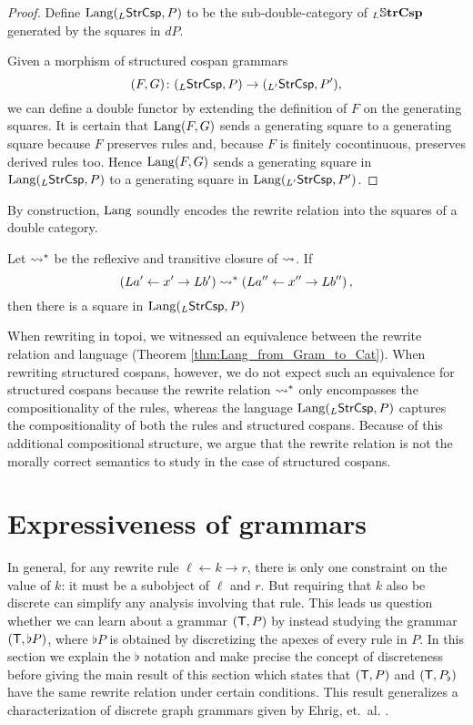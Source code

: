 \documentclass[oneside]{amsart}
\begin{document}
\begin{proof}
  Define $\mathrm{Lang} (_L\mathsf{StrCsp},P)$ to be the
  sub-double-category of $_L\mathbb{S} \mathbf{trCsp}$ generated
  by the squares in $dP$.
  
  Given a morphism of structured cospan grammars
  $$(F,G) \colon (_L\mathsf{StrCsp},P) \to (_{L'}\mathsf{StrCsp},P'),$$ we
  can define a double functor by extending the definition of
  $F$ on the generating squares. It is certain that
  $\mathrm{Lang} (F,G)$ sends a generating square to a generating
  square because $F$ preserves rules and, because $F$ is
  finitely cocontinuous, preserves derived rules too.  Hence
  $\mathrm{Lang} (F,G)$ sends a generating square in
  $\mathrm{Lang} (_{L}\mathsf{StrCsp},P)$ to a generating square in
  $\mathrm{Lang} (_{L'}\mathsf{StrCsp},P')$.
\end{proof}

By construction, $ \mathrm{Lang} $ soundly
encodes the rewrite relation into the squares of a
double category.

\begin{corollary}
  \label{thm:StrCspLang_Encodes_RewrRel}
  Let $ \rightsquigarrow^\ast $ be the reflexive and
  transitive closure of $ \rightsquigarrow $.  If
  $$ \left(La' \leftarrow x' \to Lb'\right) \rightsquigarrow^\ast \left(La'' \leftarrow x'' \to Lb''\right), $$ then there is a square
   in
  $ \mathrm{Lang} ({}_L\mathsf{StrCsp}, P) $
\end{corollary}

When rewriting in topoi, we witnessed an
equivalence between the rewrite relation and
language (Theorem
\ref{thm:Lang_from_Gram_to_Cat}). When rewriting
structured cospans, however, we do not expect such
an equivalence for structured cospans because the
rewrite relation $ \rightsquigarrow^\ast $ only encompasses
the compositionality of the rules, whereas the
language $ \mathrm{Lang} (_L\mathsf{StrCsp},P) $ captures the
compositionality of both the rules and structured
cospans. Because of this additional compositional
structure, we argue that the rewrite relation is
not the morally correct semantics to study in the
case of structured cospans. 

\section{Expressiveness of grammars}
\label{sec:gen-result-graph-rewriting}

In general, for any rewrite rule
$ \ell \gets k \to r $, there is only one
constraint on the value of $ k $: it must be a
subobject of $ \ell $ and $ r $.  But requiring
that $ k $ also be discrete can simplify
any analysis involving that rule. This leads us
question whether we can learn about a grammar
$ ( \mathsf{T},P ) $ by instead studying the grammar
$ ( \mathsf{T}, \flat P ) $, where $ \flat P $ is obtained
by discretizing the apexes of every rule in $ P
$. In this section we explain the $ \flat $
notation and make precise the concept of
discreteness before giving the main result of this
section which states that $ ( \mathsf{T},P ) $ and
$ ( \mathsf{T}, P_\flat  ) $ have the same rewrite relation
under certain conditions.  This result generalizes
a characterization of discrete graph grammars
given by Ehrig,
et.~al. \parencite[Prop.~3.3]{Ehrig_GraphGram}.
\end{document}
